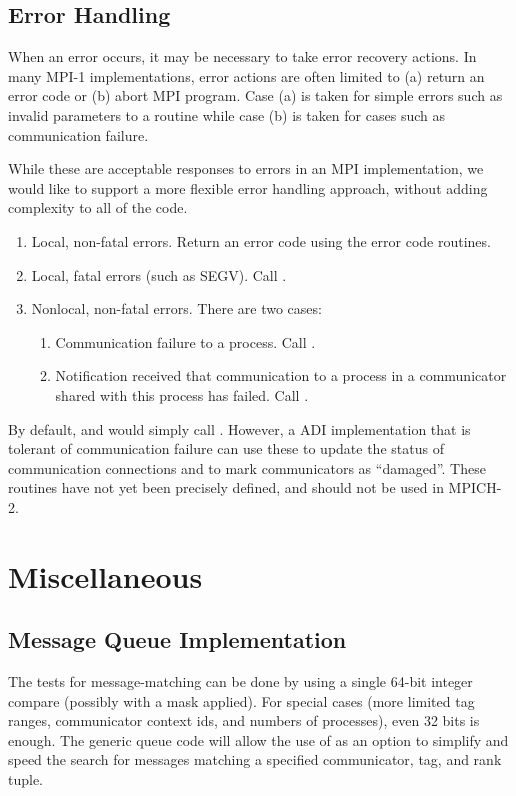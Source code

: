 \documentclass{article}
\begin{document}
\subsection{Error Handling}
\label{sec:error-handling}

When an error occurs, it may be necessary to take error recovery
actions.  In many MPI-1 implementations, error actions are often
limited to (a) return an error code or (b) abort MPI program.
Case (a) is taken for simple errors such as invalid parameters to a
routine while case (b) is taken for cases such as communication
failure.  

While these are acceptable responses to errors in an MPI
implementation, we would like to support a more flexible error
handling approach, without adding complexity to all of the code.
\begin{enumerate}
\item Local, non-fatal errors.  Return an error code using the error
code routines.
\item Local, fatal errors (such as SEGV).  Call .
\item Nonlocal, non-fatal errors.  There are two cases:
   \begin{enumerate}
   \item Communication failure to a process.  Call
       .
   \item Notification received that communication to a process in a 
       communicator shared with this process has failed.  Call 
       .
   \end{enumerate}
\end{enumerate}
By default,  and  would simply
call .  However, a ADI implementation that is
tolerant of communication failure can use these to update the status
of communication connections and to mark communicators as
``damaged''.  These routines have not yet been precisely defined, and
should not be used in MPICH-2.

%

\section{Miscellaneous}
\label{sec:misc}

\subsection{Message Queue Implementation}
The tests for message-matching can be done by using a single 64-bit
integer compare (possibly with a mask applied).  For special cases
(more limited tag ranges, communicator context ids, and numbers of
processes), even 32 bits is enough.  The generic queue code will allow
the use of  as an option to simplify and speed the
search for messages matching a specified communicator, tag, and rank
tuple.
\end{document}
